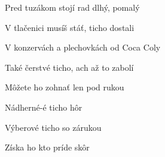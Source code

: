 \begin{song}
\bigskip

\Refren

\bigskip

 \par
{}Pred tuzákom stojí rad dlhý, pomalý \par
{}V tlačenici musíš stáť, ticho dostali \par
{}V konzervách a plechovkách od Coca Coly \par
{}Také čerstvé ticho, ach až to zabolí \par

\bigskip

Môžete ho zohnať len pod rukou \par
{}Nádherné-é ticho hôr \par
{}Výberové ticho  so zárukou \par
{}Získa ho kto príde skôr

\end{song}
